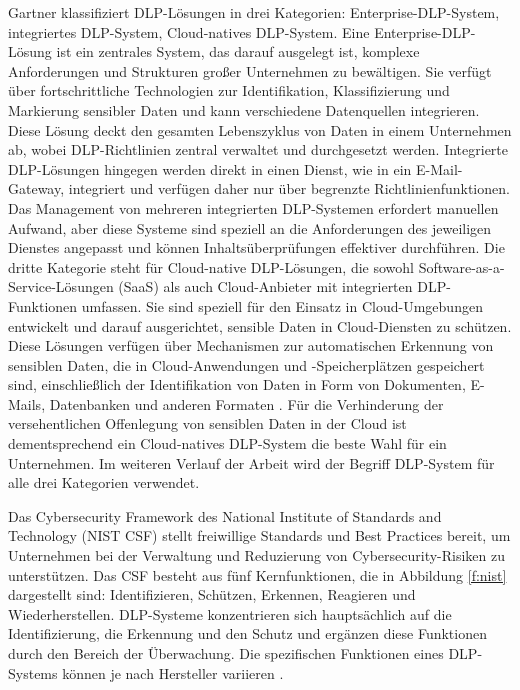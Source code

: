 Gartner klassifiziert DLP-Lösungen in drei Kategorien: Enterprise-DLP-System, integriertes DLP-System, Cloud-natives DLP-System. Eine Enterprise-DLP-Lösung ist ein zentrales System, das darauf ausgelegt ist, komplexe Anforderungen und Strukturen großer Unternehmen zu bewältigen. Sie verfügt über fortschrittliche Technologien zur Identifikation, Klassifizierung und Markierung sensibler Daten und kann verschiedene Datenquellen integrieren. Diese Lösung deckt den gesamten Lebenszyklus von Daten in einem Unternehmen ab, wobei DLP-Richtlinien zentral verwaltet und durchgesetzt werden.
Integrierte DLP-Lösungen hingegen werden direkt in einen Dienst, wie in ein E-Mail-Gateway, integriert und verfügen daher nur über begrenzte Richtlinienfunktionen. Das Management von mehreren integrierten DLP-Systemen erfordert manuellen Aufwand, aber diese Systeme sind speziell an die Anforderungen des jeweiligen Dienstes angepasst und können Inhaltsüberprüfungen effektiver durchführen.
Die dritte Kategorie steht für Cloud-native DLP-Lösungen, die sowohl Software-as-a-Service-Lösungen (SaaS) als auch Cloud-Anbieter mit integrierten DLP-Funktionen umfassen. Sie sind speziell für den Einsatz in Cloud-Umgebungen entwickelt und darauf ausgerichtet, sensible Daten in Cloud-Diensten zu schützen. Diese Lösungen verfügen über Mechanismen zur automatischen Erkennung von sensiblen Daten, die in Cloud-Anwendungen und -Speicherplätzen gespeichert sind, einschließlich der Identifikation von Daten in Form von Dokumenten, E-Mails, Datenbanken und anderen Formaten \cite{Chugh.2023}.
Für die Verhinderung der versehentlichen Offenlegung von sensiblen Daten in der Cloud ist dementsprechend ein Cloud-natives DLP-System die beste Wahl für ein Unternehmen.
Im weiteren Verlauf der Arbeit wird der Begriff DLP-System für alle drei Kategorien verwendet.

Das Cybersecurity Framework des National Institute of Standards and Technology (NIST CSF) stellt freiwillige Standards und Best Practices bereit, um Unternehmen bei der Verwaltung und Reduzierung von Cybersecurity-Risiken zu unterstützen. Das CSF besteht aus fünf Kernfunktionen, die in Abbildung \ref{f:nist} dargestellt sind: Identifizieren, Schützen, Erkennen, Reagieren und Wiederherstellen.
DLP-Systeme konzentrieren sich hauptsächlich auf die Identifizierung, die Erkennung und den Schutz und ergänzen diese Funktionen durch den Bereich der Überwachung. Die spezifischen Funktionen eines DLP-Systems können je nach Hersteller variieren \cite{NIST.2014}.

